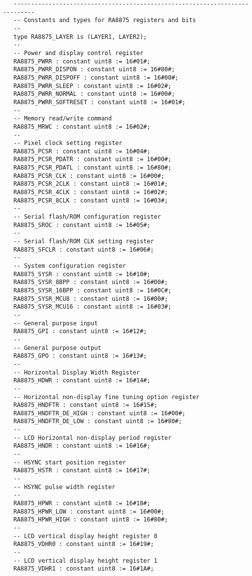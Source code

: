 \documentclass[10pt, openany]{book}
\begin{document}
\begin{lstlisting}
\end{lstlisting}
\begin{lstlisting}
   ----------------------------------------------------------------------------
   -- Constants and types for RA8875 registers and bits
   --
   type RA8875_LAYER is (LAYER1, LAYER2);
   --
   -- Power and display control register
   RA8875_PWRR : constant uint8 := 16#01#;
   RA8875_PWRR_DISPON : constant uint8 := 16#80#;
   RA8875_PWRR_DISPOFF : constant uint8 := 16#00#;
   RA8875_PWRR_SLEEP : constant uint8 := 16#02#;
   RA8875_PWRR_NORMAL : constant uint8 := 16#00#;
   RA8875_PWRR_SOFTRESET : constant uint8 := 16#01#;
   --
   -- Memory read/write command
   RA8875_MRWC : constant uint8 := 16#02#;
   --
   -- Pixel clock setting register
   RA8875_PCSR : constant uint8 := 16#04#;
   RA8875_PCSR_PDATR : constant uint8 := 16#00#;
   RA8875_PCSR_PDATL : constant uint8 := 16#80#;
   RA8875_PCSR_CLK : constant uint8 := 16#00#;
   RA8875_PCSR_2CLK : constant uint8 := 16#01#;
   RA8875_PCSR_4CLK : constant uint8 := 16#02#;
   RA8875_PCSR_8CLK : constant uint8 := 16#03#;
   --
   -- Serial flash/ROM configuration register
   RA8875_SROC : constant uint8 := 16#05#;
   --
   -- Serial flash/ROM CLK setting register
   RA8875_SFCLR : constant uint8 := 16#06#;
   --
   -- System configuration register
   RA8875_SYSR : constant uint8 := 16#10#;
   RA8875_SYSR_8BPP : constant uint8 := 16#00#;
   RA8875_SYSR_16BPP : constant uint8 := 16#0C#;
   RA8875_SYSR_MCU8 : constant uint8 := 16#00#;
   RA8875_SYSR_MCU16 : constant uint8 := 16#03#;
   --
   -- General purpose input
   RA8875_GPI : constant uint8 := 16#12#;
   --
   -- General purpose output
   RA8875_GPO : constant uint8 := 16#13#;
   --
   -- Horizontal Display Width Register
   RA8875_HDWR : constant uint8 := 16#14#;
   --
   -- Horizontal non-display fine tuning option register
   RA8875_HNDFTR : constant uint8 := 16#15#;
   RA8875_HNDFTR_DE_HIGH : constant uint8 := 16#00#;
   RA8875_HNDFTR_DE_LOW : constant uint8 := 16#80#;
   --
   -- LCD Horizontal non-display period register
   RA8875_HNDR : constant uint8 := 16#16#;
   --
   -- HSYNC start position register
   RA8875_HSTR : constant uint8 := 16#17#;
   --
   -- HSYNC pulse width register
   --
   RA8875_HPWR : constant uint8 := 16#18#;
   RA8875_HPWR_LOW : constant uint8 := 16#00#;
   RA8875_HPWR_HIGH : constant uint8 := 16#80#;
   --
   -- LCD vertical display height register 0
   RA8875_VDHR0 : constant uint8 := 16#19#;
   --
   -- LCD vertical display height register 1
   RA8875_VDHR1 : constant uint8 := 16#1A#;

\end{lstlisting}
\end{document}
